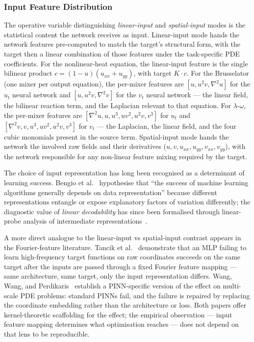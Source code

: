 \documentclass[10pt,journal,compsoc]{IEEEtran}
\begin{document}
\subsubsection{Input Feature Distribution}\label{subsubsec:feature_distribution}

The operative variable distinguishing \emph{linear-input} and
\emph{spatial-input} modes is the statistical content the network receives as
input. Linear-input mode hands the network features pre-computed to match the
target's structural form, with the target then a linear combination of those
features under the task-specific PDE coefficients. For the nonlinear-heat
equation, the linear-input feature is the single bilinear product
$c = (1-u)(u_{xx}+u_{yy})$, with target $K \cdot c$. For the Brusselator (one
mixer per output equation), the per-mixer features are $[u, u^2 v, \nabla^2
u]$ for the $u_t$ neural network and $[u, u^2 v, \nabla^2 v]$ for the $v_t$ neural
network --- the linear field, the bilinear reaction term, and the Laplacian relevant
to that equation. For $\lambda$-$\omega$, the per-mixer features are
$[\nabla^2 u, u, u^3, u v^2, u^2 v, v^3]$ for $u_t$ and
$[\nabla^2 v, v, u^3, u v^2, u^2 v, v^3]$ for $v_t$ --- the Laplacian, the
linear field, and the four cubic monomials present in the source term.
Spatial-input mode hands the network the involved raw fields and their
derivatives ($u, v, u_{xx}, u_{yy}, v_{xx}, v_{yy}$), with the network
responsible for any non-linear feature mixing required by the target.

The choice of input representation has long been recognised as a determinant
of learning success. Bengio et al.~\cite{bengio2013} hypothesise that
``the success of machine learning algorithms generally depends on data
representation'' because different representations entangle or expose
explanatory factors of variation differently; the diagnostic value of
\emph{linear decodability} has since been formalised through linear-probe
analysis of intermediate representations~\cite{alain2017}.

A more direct analogue to the linear-input vs spatial-input contrast appears
in the Fourier-feature literature. Tancik et al.~\cite{tancik2020}
demonstrate that an MLP failing to learn high-frequency target functions on
raw coordinates succeeds on the same target after the inputs are passed
through a fixed Fourier feature mapping --- same architecture, same target,
only the input representation differs. Wang, Wang, and
Perdikaris~\cite{wangwangperdikaris2021} establish a PINN-specific
version of the effect on multi-scale PDE problems: standard PINNs fail, and
the failure is repaired by replacing the coordinate embedding rather than the
architecture or loss. Both papers offer kernel-theoretic scaffolding for the
effect; the empirical observation --- input feature mapping determines what
optimisation reaches --- does not depend on that lens to be reproducible.
\end{document}
